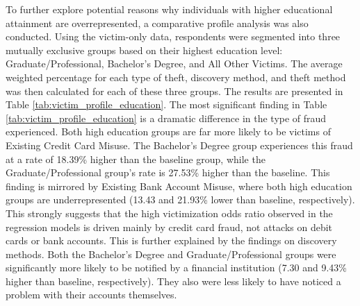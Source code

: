 To further explore potential reasons why individuals with higher educational attainment are overrepresented, a comparative profile analysis was also conducted. Using the victim-only data, respondents were segmented into three mutually exclusive groups based on their highest education level: Graduate/Professional, Bachelor's Degree, and All Other Victims. The average weighted percentage for each type of theft, discovery method, and theft method was then calculated for each of these three groups. The results are presented in Table \ref{tab:victim_profile_education}. The most significant finding in Table \ref{tab:victim_profile_education} is a dramatic difference in the type of fraud experienced. Both high education groups are far more likely to be victims of Existing Credit Card Misuse. The Bachelor's Degree group experiences this fraud at a rate of 18.39\% higher than the baseline group, while the Graduate/Professional group's rate is 27.53\% higher than the baseline. This finding is mirrored by Existing Bank Account Misuse, where both high education groups are underrepresented (13.43 and 21.93\% lower than baseline, respectively). This strongly suggests that the high victimization odds ratio observed in the regression models is driven mainly by credit card fraud, not attacks on debit cards or bank accounts. This is further explained by the findings on discovery methods. Both the Bachelor's Degree and Graduate/Professional groups were significantly more likely to be notified by a financial institution (7.30 and 9.43\% higher than baseline, respectively). They also were less likely to have noticed a problem with their accounts themselves.

